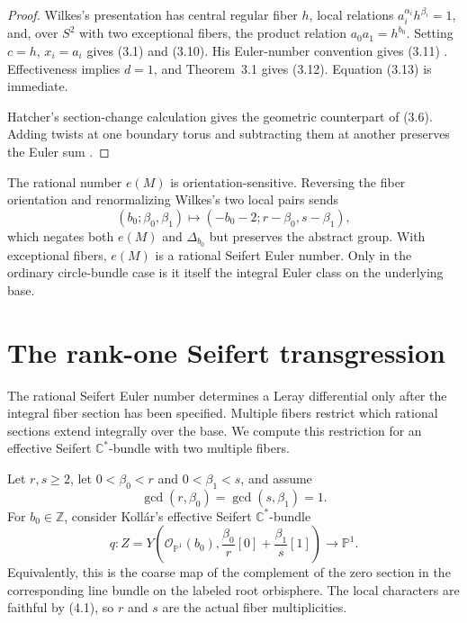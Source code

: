 \documentclass[11pt]{article}
\numberwithin{equation}{section}
\begin{document}
\begin{proof}
Wilkes's presentation has central regular fiber $h$, local relations
$a_i^{\alpha_i}h^{\beta_i}=1$, and, over $S^2$ with two exceptional
fibers, the product relation $a_0a_1=h^{b_0}$.  Setting
$c=h$, $x_i=a_i$ gives (3.1) and (3.10).  His Euler-number convention gives
(3.11) \cite[Proposition 4.3, p.~149]{Wilkes}.  Effectiveness implies
$d=1$, and Theorem~3.1 gives (3.12).  Equation (3.13) is immediate.

Hatcher's section-change calculation gives the geometric counterpart
of (3.6). Adding twists at one boundary torus and subtracting them at
another preserves the Euler sum \cite[Section 2.1, pp.~25--27]{Hatcher}.
\end{proof}

\begin{remark}
The rational number $e(M)$ is orientation-sensitive.  Reversing the fiber
orientation and renormalizing Wilkes's two local pairs sends
\[
 (b_0;\beta_0,\beta_1)
   \longmapsto(-b_0-2;r-\beta_0,s-\beta_1),
\]
which negates both $e(M)$ and $\Delta_{b_0}$ but preserves the abstract
group.  With exceptional fibers, $e(M)$ is a rational Seifert Euler number.
Only in the ordinary circle-bundle case is it itself the integral Euler
class on the underlying base.
\end{remark}

\section{The rank-one Seifert transgression}

The rational Seifert Euler number determines a Leray differential only
after the integral fiber section has been specified. Multiple fibers
restrict which rational sections extend integrally over the base.
We compute this restriction for an effective Seifert
$\mathbb C^*$-bundle with two multiple fibers.

Let $r,s\ge2$, let $0<\beta_0<r$ and $0<\beta_1<s$, and assume
\[
 \gcd(r,\beta_0)=\gcd(s,\beta_1)=1.                              \tag{4.1}
\]
For $b_0\in\mathbb Z$, consider Koll\'ar's effective Seifert
$\mathbb C^*$-bundle
\[
 q:Z=Y\left(\mathcal O_{\mathbb P^1}(b_0),
       \frac{\beta_0}{r}[0]+\frac{\beta_1}{s}[1]\right)
       \longrightarrow\mathbb P^1.                              \tag{4.2}
\]
Equivalently, this is the coarse map of the complement of the zero section
in the corresponding line bundle on the labeled root orbisphere.
The local characters are faithful by (4.1), so $r$ and $s$ are the
actual fiber multiplicities.
\end{document}
